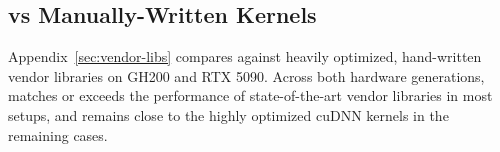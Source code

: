 



\subsection{\NAME{} vs Manually-Written Kernels}


Appendix~\ref{sec:vendor-libs} compares \NAME{} against heavily optimized,
hand-written vendor libraries on GH200 and RTX 5090.
Across both hardware generations, \NAME{} matches or exceeds the performance of
state-of-the-art vendor libraries in most setups, and remains close to the highly
optimized cuDNN kernels in the remaining cases.


